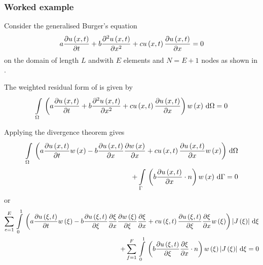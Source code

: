 \subsubsection{Worked example}

Consider the \onedal generalised Burger's equation
\begin{equation}
  a\delby{\fnof{u}{x,t}}{t}+b\deltwosqby{\fnof{u}{x,t}}{x}+c\fnof{u}{x,t}\delby{\fnof{u}{x,t}}{x}=0
  \label{eqn:onedgenburgersexample}
\end{equation}
on the \onedal domain of length $L$ andwith $E$ elements and $N=E+1$ nodes as shown in .


The weighted residual form of  is given by
\begin{equation}
  \gint{\Omega}{}{\pbrac{a\delby{\fnof{u}{x,t}}{t}+b\deltwosqby{\fnof{u}{x,t}}{x}+
      c\fnof{u}{x,t}\delby{\fnof{u}{x,t}}{x}}\fnof{w}{x}}{\Omega}=0
\end{equation}

Applying the divergence theorem gives
\begin{equation}
  \begin{split}
    \gint{\Omega}{}{\pbrac{a\delby{\fnof{u}{x,t}}{t}\fnof{w}{x}-b\delby{\fnof{u}{x,t}}{x}\delby{\fnof{w}{x}}{x}+
        c\fnof{u}{x,t}\delby{\fnof{u}{x,t}}{x}\fnof{w}{x}}}{\Omega}\\
    +\gint{\Gamma}{}{\pbrac{\dotprod{b\delby{\fnof{u}{x,t}}{x}}{n}}\fnof{w}{x}}{\Gamma}=0
  \end{split}
\end{equation}
or
\begin{equation}
  \begin{split}
    \gsum{e=1}{E}{\gint{0}{1}{\pbrac{a\delby{\fnof{u}{\xi,t}}{t}\fnof{w}{\xi}
          -b\delby{\fnof{u}{\xi,t}}{\xi}\delby{\xi}{x}\delby{\fnof{w}{\xi}}{\xi}\delby{\xi}{x}
          +c\fnof{u}{\xi,t}\delby{\fnof{u}{\xi,t}}{\xi}\delby{\xi}{x}\fnof{w}{\xi}}\abs{\fnof{J}{\xi}}}{\xi}} \\
    +\gsum{f=1}{F}{\gint{0}{1}{\pbrac{\dotprod{b\delby{\fnof{u}{\xi,t}}{\xi}\delby{\xi}{x}}{n}}\fnof{w}{\xi}
        \abs{\fnof{J}{\xi}}}{\xi}}=0
  \end{split}
\end{equation}


